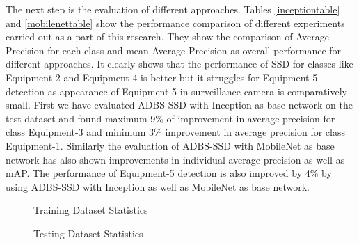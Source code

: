 \documentclass[conference]{IEEEtran}
\begin{document}
The next step is the evaluation of different approaches. Tables \ref{inceptiontable} and \ref{mobilenettable} show the performance comparison of different experiments carried out as a part of this research. They show the comparison of Average Precision for each class and mean Average Precision as overall performance for different approaches. It clearly shows that the performance of SSD for classes like Equipment-2 and Equipment-4 is better but it struggles for Equipment-5 detection as appearance of Equipment-5 in surveillance camera is comparatively small. First we have evaluated ADBS-SSD with Inception as base network on the test dataset and found maximum 9\% of improvement in average precision for class Equipment-3 and minimum 3\% improvement in average precision for class Equipment-1. Similarly the evaluation of ADBS-SSD with MobileNet as base network has also shown improvements in individual average precision as well as mAP. The performance of Equipment-5 detection is also improved by 4\% by using ADBS-SSD with Inception as well as MobileNet as base network. 

\begin{figure}
\caption{Training Dataset Statistics}\label{fig:traindatastats}
\end{figure}

\begin{figure}
\caption{Testing Dataset Statistics}\label{fig:testdatastats}
\end{figure}
\end{document}
